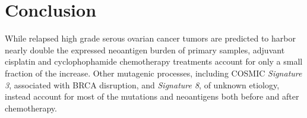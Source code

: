 \section*{Conclusion}
While relapsed high grade serous ovarian cancer tumors are predicted to harbor nearly double the expressed neoantigen burden of primary samples, adjuvant cisplatin and cyclophophamide chemotherapy treatments account for only a small fraction of the increase. Other mutagenic processes, including COSMIC \textit{Signature 3}, associated with BRCA disruption, and \textit{Signature 8}, of unknown etiology, instead account for most of the mutations and neoantigens both before and after chemotherapy.